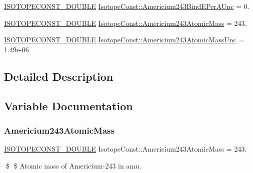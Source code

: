 \begin{DoxyCompactItemize}
\mbox{\hyperlink{group___isotope_const-_macros_ga8f45a7272ce02c0b4c65c44636ed719a}{I\+S\+O\+T\+O\+P\+E\+C\+O\+N\+S\+T\+\_\+\+D\+O\+U\+B\+LE}} \mbox{\hyperlink{group___isotope_const-_americium-_am243_gac2f71e8f77050e069e3067dea22959c9}{Isotope\+Const\+::\+Americium243\+Bind\+E\+Per\+A\+Unc}} = 0.
\item 
\mbox{\hyperlink{group___isotope_const-_macros_ga8f45a7272ce02c0b4c65c44636ed719a}{I\+S\+O\+T\+O\+P\+E\+C\+O\+N\+S\+T\+\_\+\+D\+O\+U\+B\+LE}} \mbox{\hyperlink{group___isotope_const-_americium-_am243_ga89797e643e307e86ed180353671acbb3}{Isotope\+Const\+::\+Americium243\+Atomic\+Mass}} = 243.
\item 
\mbox{\hyperlink{group___isotope_const-_macros_ga8f45a7272ce02c0b4c65c44636ed719a}{I\+S\+O\+T\+O\+P\+E\+C\+O\+N\+S\+T\+\_\+\+D\+O\+U\+B\+LE}} \mbox{\hyperlink{group___isotope_const-_americium-_am243_ga85c33f5a7a25b0db7e6824b51c7cc06a}{Isotope\+Const\+::\+Americium243\+Atomic\+Mass\+Unc}} = 1.\+49e-\/06
\end{DoxyCompactItemize}


\subsection{Detailed Description}


\subsection{Variable Documentation}
\mbox{\label{group___isotope_const-_americium-_am243_ga89797e643e307e86ed180353671acbb3}} 
\subsubsection{\texorpdfstring{Americium243\+Atomic\+Mass}{Americium243AtomicMass}}
{\footnotesize\ttfamily \mbox{\hyperlink{group___isotope_const-_macros_ga8f45a7272ce02c0b4c65c44636ed719a}{I\+S\+O\+T\+O\+P\+E\+C\+O\+N\+S\+T\+\_\+\+D\+O\+U\+B\+LE}} Isotope\+Const\+::\+Americium243\+Atomic\+Mass = 243.}

\$ \$ Atomic mass of Americium-\/243 in amu. \mbox{\label{group___isotope_const-_americium-_am243_ga85c33f5a7a25b0db7e6824b51c7cc06a}} 

